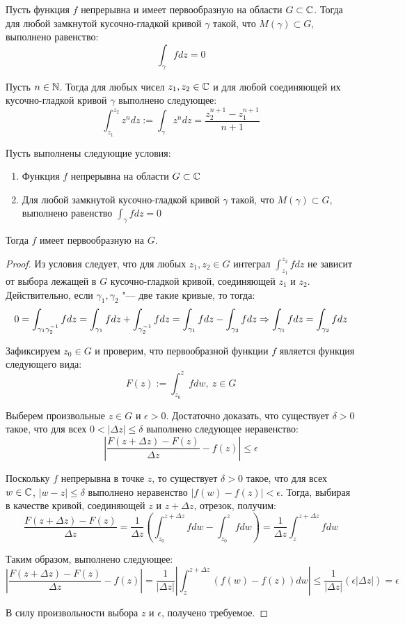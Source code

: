 \begin{corollary}
	Пусть функция $f$ непрерывна и имеет первообразную на области $G \subset \mathbb{C}$. Тогда для любой замкнутой кусочно-гладкой кривой $\gamma$ такой, что $M(\gamma) \subset G$, выполнено равенство:
	\[\int_\gamma fdz = 0\]
\end{corollary}

\begin{example}
	Пусть $n \in \mathbb{N}$. Тогда для любых чисел $z_1, z_2 \in \mathbb{C}$ и для любой соединяющей их кусочно-гладкой кривой $\gamma$ выполнено следующее:
	\[\int_{z_1}^{z_2}z^ndz := \int_\gamma z^ndz = \frac{z_2^{n+1} - z_1^{n+1}}{n+1}\]
\end{example}

\begin{proposition}
	Пусть выполнены следующие условия:
	\begin{enumerate}
		\item Функция $f$ непрерывна на области $G \subset \mathbb{C}$
		\item Для любой замкнутой кусочно-гладкой кривой $\gamma$ такой, что $M(\gamma) \subset G$, выполнено равенство $\int_\gamma fdz = 0$
	\end{enumerate}

	Тогда $f$ имеет первообразную на $G$.
\end{proposition}

\begin{proof}
	Из условия следует, что для любых $z_1, z_2 \in G$ интеграл $\int_{z_1}^{z_2} fdz$ не зависит от выбора лежащей в $G$ кусочно-гладкой кривой, соединяющей $z_1$ и $z_2$. Действительно, если $\gamma_1, \gamma_2$ "--- две такие кривые, то тогда:
	\[0 = \int_{\gamma_1\gamma_2^{-1}}fdz = \int_{\gamma_1}fdz + \int_{\gamma_2^{-1}}fdz = \int_{\gamma_1}fdz - \int_{\gamma_2}fdz \Rightarrow \int_{\gamma_1}fdz = \int_{\gamma_2}fdz\]
	
	Зафиксируем $z_0 \in G$ и проверим, что первообразной функции $f$ является функция следующего вида:
	\[F(z) := \int_{z_0}^zfdw,~z \in G\]
	
	Выберем произвольные $z \in G$ и $\epsilon > 0$. Достаточно доказать, что существует $\delta > 0$ такое, что для всех $0 < |\Delta z| \le \delta$ выполнено следующее неравенство:
	\[\left|\frac{F(z + \Delta z) - F(z)}{\Delta z} - f(z)\right| \le \epsilon\]
	
	Поскольку $f$ непрерывна в точке $z$, то существует $\delta > 0$ такое, что для всех $w \in \mathbb{C}$, $|w - z| \le \delta$ выполнено неравенство $|f(w) - f(z)| < \epsilon$. Тогда, выбирая в качестве кривой, соединяющей $z$ и $z + \Delta z$, отрезок, получим:
	\[\frac{F(z + \Delta z) - F(z)}{\Delta z} = \frac{1}{\Delta z}\left(\int_{z_0}^{z + \Delta z}fdw - \int_{z_0}^{z}fdw\right) = \frac{1}{\Delta z}\int_{z}^{z + \Delta z}fdw\]
	
	Таким образом, выполнено следующее:
	\[\left|\frac{F(z + \Delta z) - F(z)}{\Delta z} - f(z)\right| = \frac1{|\Delta z|}\left|\int_z^{z + \Delta z}\left(f(w) - f(z)\right)dw\right| \le \frac1{|\Delta z|}(\epsilon|\Delta z|) = \epsilon\]
	
	В силу произвольности выбора $z$ и $\epsilon$, получено требуемое.
\end{proof}

